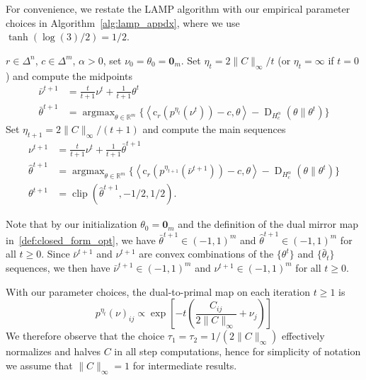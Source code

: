 \documentclass[10pt]{article}
\newcommand{\R}{\mathbb{R}}
\newcommand{\DHa}{\D_{H_c^\alpha}}
\DeclareMathOperator*{\argmax}{argmax}
\newcommand{\inner}[2]{\left\langle #1,#2\right\rangle}
\newcommand{\D}{\operatorname{D}}
\theoremstyle{plain}
\theoremstyle{definition}
\theoremstyle{remark}
\newcommand{\zero}{\mathbf{0}}
\newcommand{\col}{\bm{\mathrm{c}}}
\begin{document}
For convenience, we restate the LAMP algorithm with our empirical parameter choices in Algorithm~\ref{alg:lamp_appdx}, where we use $\tanh(\log(3)/2)=1/2$.
\begin{algorithm}[H]\caption{LAMP (Performant Parameters)}\label{alg:lamp_appdx}
    \begin{algorithmic}
        \REQUIRE $r\in\Delta^n$, $c\in\Delta^m$, $\alpha >0$, set $\nu_0=\theta_0=\zero_m$.
        \STATE Set $\eta_t=2\|C\|_\infty/t$ (or $\eta_t=\infty$ if $t=0$) and compute the midpoints
        \begin{align}
        \bar\nu^{t+1} &= \frac{t}{t+1}\nu^t + \frac{1}{t+1}\theta^t\label{def:bar_nu}\\
            \bar \theta^{t+1} &= \argmax_{\theta\in \R^m}\{\inner{\col_r(p^{\eta_t}(\nu^t))-c}{\theta} - \DHa(\theta\|\theta^t)\}\label{def:bar_theta}
        \end{align}
        \STATE Set $\eta_{t+1}=2\|C\|_\infty/(t+1)$ and compute the main sequences
        \begin{align}
         \nu^{t+1} &= \frac{t}{t+1}\nu^t + \frac{1}{t+1}\bar\theta^{t+1}\label{def:nu}\\
            \hat\theta^{t+1} &= \argmax_{\theta\in \R^m}\{\inner{\col_r(p^{\eta_{t+1}}(\bar\nu^{t+1}))-c}{\theta} - \DHa(\theta\|\theta^t)\}\label{def:theta_hat}\\
            \theta^{t+1}&=\operatorname{clip}(\hat\theta^{t+1}, -1/2,1/2).\label{def:theta}
        \end{align}
        \ENDFOR
    \end{algorithmic}
\end{algorithm}
Note that by our initialization $\theta_0=\zero_m$ and the definition of the dual mirror map in~\eqref{def:closed_form_opt}, we have $\bar\theta^{t+1}\in(-1,1)^m$ and $\hat\theta^{t+1}\in(-1,1)^m$ for all $t\geq 0$. Since $\bar\nu^{t+1}$ and $\nu^{t+1}$ are convex combinations of the $\{\theta^{t}\}$ and $\{\bar\theta_t\}$ sequences, we then have $\bar\nu^{t+1}\in(-1,1)^m$ and $\nu^{t+1}\in(-1,1)^m$ for all $t\geq 0$.

With our parameter choices, the dual-to-primal map on each iteration $t\geq 1$ is
\begin{equation}\label{def:pd_map_appdx}
p^{\eta_t}(\nu)_{ij}\propto\exp\left[-t\left(\frac{C_{ij}}{2\|C\|_\infty}+\nu_j\right)\right]
\end{equation}
We therefore observe that the choice $\tau_1=\tau_2=1/(2\|C\|_\infty)$ effectively normalizes and halves $C$ in all step computations, hence for simplicity of notation we assume that $\|C\|_\infty=1$ for intermediate results. 
\end{document}
